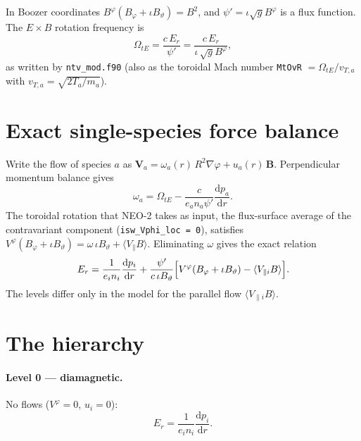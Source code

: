 \documentclass[11pt]{article}
\newcommand{\rd}{\mathrm{d}}
\newcommand{\tht}{\vartheta}
\newcommand{\ph}{\varphi}
\newcommand{\code}[1]{\texttt{#1}}
\begin{document}
In Boozer coordinates $B^\ph(B_\ph + \iota B_\tht) = B^2$, and $\psi' =
\iota\sqrt{g}B^\ph$ is a flux function.  The $E\times B$ rotation frequency is
\begin{equation}\label{eq:omte}
  \Omega_{tE} = \frac{c\,E_r}{\psi'}
  = \frac{c\,E_r}{\iota\,\sqrt{g}B^\ph},
\end{equation}
as written by \code{ntv\_mod.f90} (also as the toroidal Mach number
\code{MtOvR} $=\Omega_{tE}/v_{T,a}$ with $v_{T,a}=\sqrt{2T_a/m_a}$).

\section{Exact single-species force balance}

Write the flow of species $a$ as $\mathbf{V}_a = \omega_a(r)\,R^2\nabla\ph +
u_a(r)\,\mathbf{B}$.  Perpendicular momentum balance
\cite{HintonHazeltine1976,HelanderSigmar2002} gives
\begin{equation}\label{eq:omega}
  \omega_a = \Omega_{tE} - \frac{c}{e_a n_a \psi'}\frac{\rd p_a}{\rd r}.
\end{equation}
The toroidal rotation that NEO-2 takes as input, the flux-surface average of
the contravariant component (\code{isw\_Vphi\_loc = 0}), satisfies
$V^\ph(B_\ph + \iota B_\tht) = \omega\,\iota B_\tht + \langle V_\parallel
B\rangle$.  Eliminating $\omega$ gives the exact relation
\begin{equation}\label{eq:exact}
  E_r = \frac{1}{e_i n_i}\frac{\rd p_i}{\rd r}
      + \frac{\psi'}{c\,\iota B_\tht}
        \Bigl[V^\ph(B_\ph + \iota B_\tht)
              - \langle V_{\parallel i} B\rangle\Bigr].
\end{equation}
The levels differ only in the model for the parallel flow
$\langle V_{\parallel i}B\rangle$.

\section{The hierarchy}

\paragraph{Level 0 --- diamagnetic.}  No flows ($V^\ph = 0$, $u_i = 0$):
\begin{equation}\label{eq:level0}
  E_r = \frac{1}{e_i n_i}\frac{\rd p_i}{\rd r}.
\end{equation}
\end{document}
